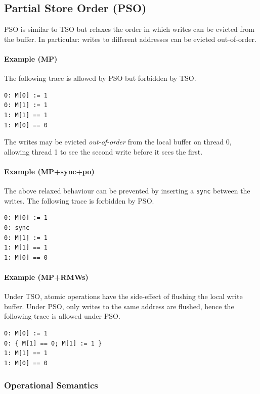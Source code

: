 \documentclass[11pt]{article}
\begin{document}
\subsection{Partial Store Order (PSO)}

PSO is similar to TSO but relaxes the order in which writes can be
evicted from the buffer.  In particular: writes to different addresses
can be evicted out-of-order.

\paragraph{Example (MP)} The following trace is allowed by PSO but
forbidden by TSO.

\begin{verbatim}
0: M[0] := 1
0: M[1] := 1
1: M[1] == 1
1: M[0] == 0
\end{verbatim}

\noindent The writes may be evicted \emph{out-of-order} from the local
buffer on thread 0, allowing thread 1 to see the second write before
it sees the first.

\paragraph{Example (MP+sync+po)} The above relaxed behaviour can be
prevented by inserting a \verb!sync! between the writes.  The
following trace is forbidden by PSO.

\begin{verbatim}
0: M[0] := 1
0: sync
0: M[1] := 1
1: M[1] == 1
1: M[0] == 0
\end{verbatim}

\paragraph{Example (MP+RMWs)}  Under TSO, atomic operations have the
side-effect of flushing the local write buffer.  Under PSO, only
writes to the same address are flushed, hence the following trace
is allowed under PSO.

\begin{verbatim}
0: M[0] := 1
0: { M[1] == 0; M[1] := 1 }
1: M[1] == 1
1: M[0] == 0
\end{verbatim}

\subsubsection*{Operational Semantics}
\end{document}
